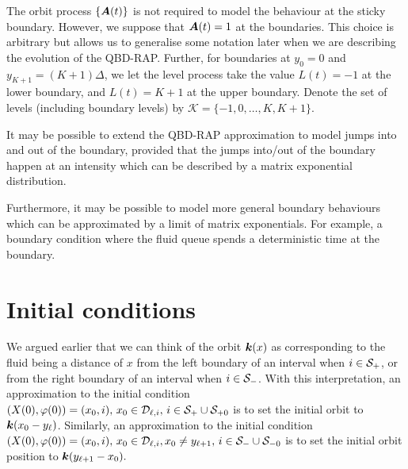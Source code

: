 The orbit process \(\{\boldsymbol A(t)\}\) is not required to model the behaviour at the sticky boundary. However, we suppose that \(\boldsymbol A(t)=1\) at the boundaries. This choice is arbitrary but allows us to generalise some notation later when we are describing the evolution of the QBD-RAP. Further, for boundaries at \(y_0=0\) and \(y_{K+1} = (K+1)\Delta\), we let the level process take the value \(L(t)=-1\) at the lower boundary, and \(L(t)=K+1\) at the upper boundary. Denote the set of levels (including boundary levels) by \(\mathcal K = \{-1,0,\dots,K,K+1\}\). 

\begin{rem}
	It may be possible to extend the QBD-RAP approximation to model jumps into and out of the boundary, provided that the jumps into/out of the boundary happen at an intensity which can be described by a matrix exponential distribution. 
	
	Furthermore, it may be possible to model more general boundary behaviours which can be approximated by a limit of matrix exponentials. For example, a boundary condition where the fluid queue spends a deterministic time at the boundary. 
\end{rem}

\section{Initial conditions}\label{sec: initial conditions}

We argued earlier that we can think of the orbit \(\boldsymbol k(x)\) as corresponding to the fluid being a distance of \(x\) from the left boundary of an interval when \(i\in\mathcal{S}_+\), or from the right boundary of an interval when \(i\in\mathcal{S}_-\). With this interpretation, an approximation to the initial condition \((X(0),\varphi(0))=(x_0,i),\,x_0\in\mathcal D_{\ell,i},\,i\in\mathcal S_+\cup\mathcal{S}_{+0}\) is to set the initial orbit to \(\boldsymbol k(x_0-y_{\ell})\). Similarly, an approximation to the initial condition \((X(0),\varphi(0))=(x_0,i), \,x_0\in\mathcal D_{\ell,i}, x_0\neq y_{\ell+1},\,i\in\mathcal S_-\cup\mathcal{S}_{-0}\) is to set the initial orbit position to \(\boldsymbol k(y_{\ell+1}-x_0).\) 

